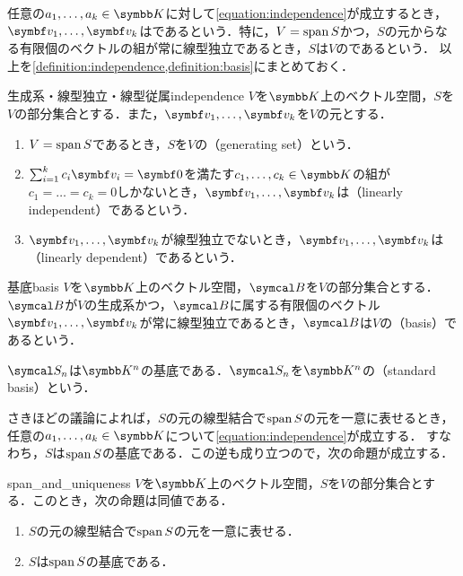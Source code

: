 \documentclass[../../main]{subfiles}
\begin{document}
任意の\(a_1,\dots,a_k\in\numset{K}\)に対して\cref{equation:independence}が成立するとき，
\(\vect{v}_1,\dots,\vect{v}_k\)はであるという．特に，\(V=\operatorname{span} S\)かつ，\(S\)の元からなる有限個のベクトルの組が常に線型独立であるとき，\(S\)は\(V\)のであるという．
以上を\cref{definition:independence,definition:basis}にまとめておく．

\begin{definition}{生成系・線型独立・線型従属}{independence}
  \(V\)を\(\numset{K}\)上のベクトル空間，\(S\)を\(V\)の部分集合とする．また，\(\vect{v}_1,\dots,\vect{v}_k\)を\(V\)の元とする．
  \begin{enumerate}
    \item \(V=\operatorname{span} S\)であるとき，\(S\)を\(V\)の（generating set）という．
    \item \(\sum_{i=1}^kc_i\vect{v}_i=\zvec\)を満たす\(c_1,\dots,c_k\in\numset{K}\)の組が\(c_1=\dots=c_k=0\)しかないとき，\(\vect{v}_1,\dots,\vect{v}_k\)は（linearly independent）であるという．
    \item \(\vect{v}_1,\dots,\vect{v}_k\)が線型独立でないとき，\(\vect{v}_1,\dots,\vect{v}_k\)は（linearly dependent）であるという．
  \end{enumerate}
\end{definition}

\begin{definition}{基底}{basis}
  \(V\)を\(\numset{K}\)上のベクトル空間，\(\basis{B}\)を\(V\)の部分集合とする．
  \(\basis{B}\)が\(V\)の生成系かつ，\(\basis{B}\)に属する有限個のベクトル\(\vect{v}_1,\dots,\vect{v}_k\)が常に線型独立であるとき，\(\basis{B}\)は\(V\)の（basis）であるという．
\end{definition}

\begin{example}[標準基底]
  \(\basis{S}_n\)は\(\numset{K}^n\)の基底である．\(\basis{S}_n\)を\(\numset{K}^n\)の（standard basis）という．
\end{example}

さきほどの議論によれば，\(S\)の元の線型結合で\(\operatorname{span} S\)の元を一意に表せるとき，任意の\(a_1,\dots,a_k\in\numset{K}\)について\cref{equation:independence}が成立する．
すなわち，\(S\)は\(\operatorname{span} S\)の基底である．この逆も成り立つので，次の命題が成立する．

\begin{proposition}{}{span_and_uniqueness}
  \(V\)を\(\numset{K}\)上のベクトル空間，\(S\)を\(V\)の部分集合とする．このとき，次の命題は同値である．
  \begin{enumerate}
    \item \(S\)の元の線型結合で\(\operatorname{span} S\)の元を一意に表せる．
    \item \(S\)は\(\operatorname{span} S\)の基底である．
  \end{enumerate}
\end{proposition}
\end{document}

